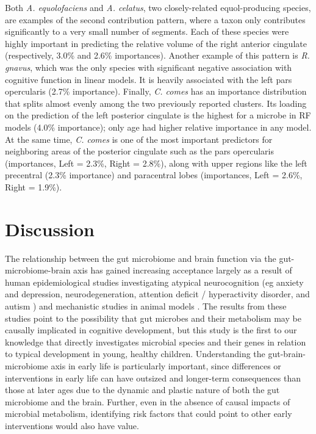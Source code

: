 \documentclass{article}
\begin{document}
Both \emph{A. equolofaciens} and \emph{A. celatus}, two closely-related
equol-producing species, are examples of the second contribution
pattern, where a taxon only contributes significantly to a very small number of segments. 
Each of these species were highly important in predicting the relative volume of
the right anterior cingulate (respectively, 3.0\% and 2.6\% importances).
Another example of this pattern is \emph{R. gnavus}, which was the only
species with significant negative association with cognitive function in linear models.
It is heavily associated with the left pars opercularis (2.7\% importance). 
Finally, \emph{C. comes} has an importance
distribution that splits almost evenly among the two previously reported
clusters. Its loading on the prediction of the left posterior cingulate
is the highest for a microbe in RF models (4.0\% importance);
only age had higher relative importance in any model. At the same time,
\textit{C. comes} is one of the most important predictors for neighboring areas of the
posterior cingulate such as the pars opercularis (importances,
Left = 2.3\%, Right = 2.8\%), along with upper regions like the left
precentral (2.3\% importance) and paracentral lobes (importances, Left = 2.6\%, Right = 1.9\%).

\section*{Discussion}

The relationship between the gut microbiome and brain function via the
gut-microbiome-brain axis has gained increasing acceptance largely as a
result of human epidemiological studies investigating atypical
neurocognition (eg anxiety and depression, neurodegeneration, attention
deficit / hyperactivity disorder, and autism \cite{romanGutBrainAxis2018,fosterGutBrainAxis2013})
and mechanistic studies in animal models
\cite{hsiaoMicrobiotaModulateBehavioral2013,needhamGutderivedMetaboliteAlters2022}.
The results from these studies point to the possibility
that gut microbes and their metabolism may be causally implicated in
cognitive development, but this study is the first to our knowledge that
directly investigates microbial species and their genes in relation to
typical development in young, healthy children. Understanding the gut-brain-microbiome axis
in early life is particularly important, since differences or
interventions in early life can have outsized and longer-term
consequences than those at later ages
due to the dynamic and plastic nature of both the gut microbiome and the brain.
Further, even in the absence of
causal impacts of microbial metabolism, identifying risk factors that
could point to other early interventions would also have value.
\end{document}
